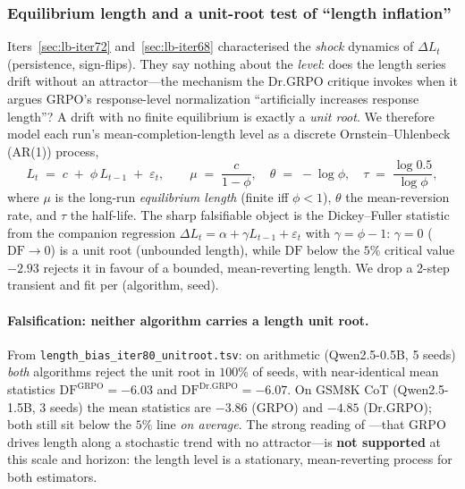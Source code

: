 
\subsubsection{Equilibrium length and a unit-root test of ``length inflation''}\label{sec:lb-iter80}

Iters~\ref{sec:lb-iter72} and~\ref{sec:lb-iter68} characterised the
\emph{shock} dynamics of $\Delta L_t$ (persistence, sign-flips). They say
nothing about the \emph{level}: does the length series drift without an
attractor---the mechanism the Dr.GRPO critique
\citep{tong2025drgrpo} invokes when it argues GRPO's response-level
normalization ``artificially increases response length''? A drift with no
finite equilibrium is exactly a \emph{unit root}. We therefore model each
run's mean-completion-length level as a discrete Ornstein--Uhlenbeck (AR(1))
process,
\begin{equation}\label{eq:lb80-ou}
L_t \;=\; c \;+\; \phi\, L_{t-1} \;+\; \varepsilon_t,
\qquad
\mu \;=\; \frac{c}{1-\phi},\quad
\theta \;=\; -\log\phi,\quad
\tau \;=\; \frac{\log 0.5}{\log\phi},
\end{equation}
where $\mu$ is the long-run \emph{equilibrium length} (finite iff
$\phi<1$), $\theta$ the mean-reversion rate, and $\tau$ the half-life. The
sharp falsifiable object is the Dickey--Fuller statistic from the companion
regression $\Delta L_t = \alpha + \gamma L_{t-1} + \varepsilon_t$ with
$\gamma=\phi-1$: $\gamma=0$ ($\mathrm{DF}\!\to\!0$) is a unit root
(unbounded length), while $\mathrm{DF}$ below the $5\%$ critical value
$-2.93$ rejects it in favour of a bounded, mean-reverting length. We drop a
2-step transient and fit per (algorithm, seed).

\paragraph{Falsification: neither algorithm carries a length unit root.}
From \texttt{length\_bias\_iter80\_unitroot.tsv}: on arithmetic
(Qwen2.5-0.5B, 5 seeds) \emph{both} algorithms reject the unit root in
$100\%$ of seeds, with near-identical mean statistics
$\mathrm{DF}^{\mathrm{GRPO}}=-6.03$ and
$\mathrm{DF}^{\mathrm{Dr.GRPO}}=-6.07$. On GSM8K CoT (Qwen2.5-1.5B, 3 seeds)
the mean statistics are $-3.86$ (GRPO) and $-4.85$ (Dr.GRPO); both still sit
below the $5\%$ line \emph{on average}. The strong reading of
\citet{tong2025drgrpo}---that GRPO drives length along a stochastic trend
with no attractor---is \textbf{not supported} at this scale and horizon: the
length level is a stationary, mean-reverting process for both estimators.

